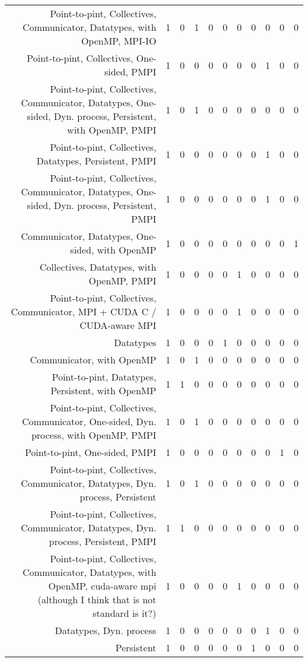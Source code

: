 {\begin{landscape}
\begin{longtable}[htb]{r|c|c|c|c|c|c|c|c|c|c}
{Point-to-pint, Collectives, Communicator, Datatypes, with OpenMP, MPI-IO} & 1 & 0 & 1 & 0 & 0 & 0 & 0 & 0 & 0 & 0 \\%
{Point-to-pint, Collectives, One-sided, PMPI} & 1 & 0 & 0 & 0 & 0 & 0 & 0 & 1 & 0 & 0 \\%
{Point-to-pint, Collectives, Communicator, Datatypes, One-sided, Dyn. process, Persistent, with OpenMP, PMPI} & 1 & 0 & 1 & 0 & 0 & 0 & 0 & 0 & 0 & 0 \\%
{Point-to-pint, Collectives, Datatypes, Persistent, PMPI} & 1 & 0 & 0 & 0 & 0 & 0 & 0 & 1 & 0 & 0 \\%
{Point-to-pint, Collectives, Communicator, Datatypes, One-sided, Dyn. process, Persistent, PMPI} & 1 & 0 & 0 & 0 & 0 & 0 & 0 & 1 & 0 & 0 \\%
{Communicator, Datatypes, One-sided, with OpenMP} & 1 & 0 & 0 & 0 & 0 & 0 & 0 & 0 & 0 & 1 \\%
{Collectives, Datatypes, with OpenMP, PMPI} & 1 & 0 & 0 & 0 & 0 & 1 & 0 & 0 & 0 & 0 \\%
{Point-to-pint, Collectives, Communicator, MPI + CUDA C / CUDA-aware MPI} & 1 & 0 & 0 & 0 & 0 & 1 & 0 & 0 & 0 & 0 \\%
{Datatypes} & 1 & 0 & 0 & 0 & 1 & 0 & 0 & 0 & 0 & 0 \\%
{Communicator, with OpenMP} & 1 & 0 & 1 & 0 & 0 & 0 & 0 & 0 & 0 & 0 \\%
{Point-to-pint, Datatypes, Persistent, with OpenMP} & 1 & 1 & 0 & 0 & 0 & 0 & 0 & 0 & 0 & 0 \\%
{Point-to-pint, Collectives, Communicator, One-sided, Dyn. process, with OpenMP, PMPI} & 1 & 0 & 1 & 0 & 0 & 0 & 0 & 0 & 0 & 0 \\%
{Point-to-pint, One-sided, PMPI} & 1 & 0 & 0 & 0 & 0 & 0 & 0 & 0 & 1 & 0 \\%
{Point-to-pint, Collectives, Communicator, Datatypes, Dyn. process, Persistent} & 1 & 0 & 1 & 0 & 0 & 0 & 0 & 0 & 0 & 0 \\%
{Point-to-pint, Collectives, Communicator, Datatypes, Dyn. process, Persistent, PMPI} & 1 & 1 & 0 & 0 & 0 & 0 & 0 & 0 & 0 & 0 \\%
{Point-to-pint, Collectives, Communicator, Datatypes, with OpenMP, cuda-aware mpi (although I think that is not standard is it?)} & 1 & 0 & 0 & 0 & 0 & 1 & 0 & 0 & 0 & 0 \\%
{Datatypes, Dyn. process} & 1 & 0 & 0 & 0 & 0 & 0 & 0 & 1 & 0 & 0 \\%
{Persistent} & 1 & 0 & 0 & 0 & 0 & 0 & 1 & 0 & 0 & 0 \\%

\end{longtable}
\end{landscape}}
